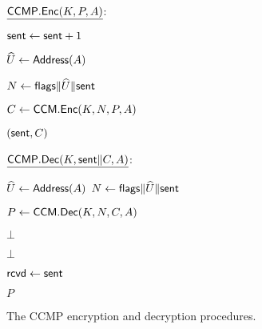 \begin{figure}
\begin{adjustbox}{margin*=2ex,width=0.9\textwidth,frame,center}

	\begin{minipage}[t]{0.48\textwidth}
	
		$\underline{\mathsf{CCMP}.\mathsf{Enc}(K, P, A)}$: 
		\begin{algorithmic}[1]
			
			\State $\mathsf{sent} \gets \mathsf{sent} + 1$
			
			\State $\widehat{U} \gets \mathsf{Address}(A)$
			
			\State $N \gets \mathsf{flags} \| \widehat{U} \| \mathsf{sent} $
			
			\State 
			
			\State $C \gets \mathsf{CCM}.\mathsf{Enc}(K, N, P, A)$
			
			\State 
			\State \Return $(\mathsf{sent}, C)$
	
		\end{algorithmic}
	\end{minipage}
	
	\begin{minipage}[t]{0.42\textwidth}		
		$\underline{\mathsf{CCMP}.\mathsf{Dec}(K, \mathsf{sent} \| C, A)}$: 
		\begin{algorithmic}[1]
			
			\State $\widehat{U} \gets \mathsf{Address}(A)$
			\State $N \gets \mathsf{flags} \| \widehat{U} \| \mathsf{sent}$
			
			\State
			\State $P \gets \mathsf{CCM}.\mathsf{Dec}(K, N, C, A)$ \label{alg:CCMP:line:CCM_decrypt}
			
			\State
			\If{$P = \bot$}
				\State \Return $\bot$
			\EndIf
			
			\State
			\If{$\sent \leq \received$} \label{alg:CCMP:line:check_replay}
				\State \Return $\bot$
			\EndIf
			
			\State
			\State $\mathsf{rcvd} \gets \mathsf{sent}$
			
			\State 
			\State \Return $P$

		\end{algorithmic}

	\end{minipage}
\end{adjustbox}

\caption{The CCMP encryption and decryption procedures.}
\label{fig:CCMP}
\end{figure}


